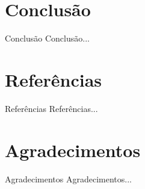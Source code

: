 \documentclass[xcolor=dvipsnames,10pt]{beamer}
\begin{document}
\section{Conclusão}

\begin{frame}

\begin{block}{Conclusão}
Conclusão...
\end{block}

\end{frame}

\section{Referências}

\begin{frame}

\begin{block}{Referências}
Referências...
\end{block}

\end{frame}

\section{Agradecimentos}

\begin{frame}

\begin{block}{Agradecimentos}
Agradecimentos...
\end{block}

\end{frame}
\end{document}
